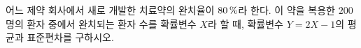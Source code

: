 어느 제약 회사에서 새로 개발한 치료약의 완치율이 $80\mkern3mu \%$라 한다. 이 약을 복용한 $200$명의 환자 중에서 완치되는 환자 수를 확률변수 $X$라 할 때, 확률변수 $Y=2X-1$의 평균과 표준편차를 구하시오.
